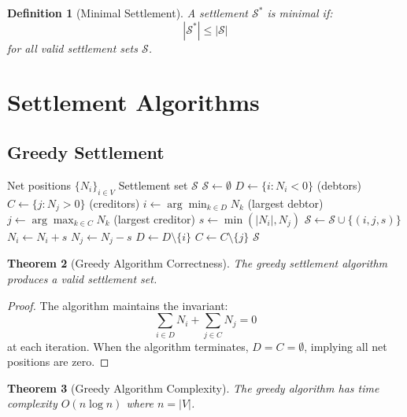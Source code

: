 \documentclass[12pt]{article}
\newtheorem{theorem}{Theorem}
\newtheorem{definition}[theorem]{Definition}
\begin{document}
\begin{definition}[Minimal Settlement]
A settlement $\mathcal{S}^*$ is minimal if:
$$
|\mathcal{S}^*| \leq |\mathcal{S}|
$$
for all valid settlement sets $\mathcal{S}$.
\end{definition}

\section{Settlement Algorithms}

\subsection{Greedy Settlement}

\begin{algorithm}
\caption{Greedy Settlement Algorithm}
\begin{algorithmic}[1]
\REQUIRE Net positions $\{N_i\}_{i \in V}$
\ENSURE Settlement set $\mathcal{S}$
\STATE $\mathcal{S} \leftarrow \emptyset$
\STATE $D \leftarrow \{i : N_i < 0\}$ (debtors)
\STATE $C \leftarrow \{j : N_j > 0\}$ (creditors)
    \STATE $i \leftarrow \arg\min_{k \in D} N_k$ (largest debtor)
    \STATE $j \leftarrow \arg\max_{k \in C} N_k$ (largest creditor)
    \STATE $s \leftarrow \min(|N_i|, N_j)$
    \STATE $\mathcal{S} \leftarrow \mathcal{S} \cup \{(i,j,s)\}$
    \STATE $N_i \leftarrow N_i + s$
    \STATE $N_j \leftarrow N_j - s$
        \STATE $D \leftarrow D \setminus \{i\}$
    \ENDIF
        \STATE $C \leftarrow C \setminus \{j\}$
    \ENDIF
\ENDWHILE
\RETURN $\mathcal{S}$
\end{algorithmic}
\end{algorithm}

\begin{theorem}[Greedy Algorithm Correctness]
The greedy settlement algorithm produces a valid settlement set.
\end{theorem}

\begin{proof}
The algorithm maintains the invariant:
$$
\sum_{i \in D} N_i + \sum_{j \in C} N_j = 0
$$
at each iteration. When the algorithm terminates, $D = C = \emptyset$, implying all net positions are zero.
\end{proof}

\begin{theorem}[Greedy Algorithm Complexity]
The greedy algorithm has time complexity $O(n \log n)$ where $n = |V|$.
\end{theorem}
\end{document}
